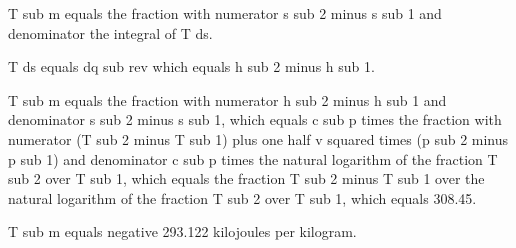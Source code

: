 T sub m equals the fraction with numerator s sub 2 minus s sub 1 and denominator the integral of T ds.

T ds equals dq sub rev which equals h sub 2 minus h sub 1.

T sub m equals the fraction with numerator h sub 2 minus h sub 1 and denominator s sub 2 minus s sub 1, which equals c sub p times the fraction with numerator (T sub 2 minus T sub 1) plus one half v squared times (p sub 2 minus p sub 1) and denominator c sub p times the natural logarithm of the fraction T sub 2 over T sub 1, which equals the fraction T sub 2 minus T sub 1 over the natural logarithm of the fraction T sub 2 over T sub 1, which equals 308.45.

T sub m equals negative 293.122 kilojoules per kilogram.